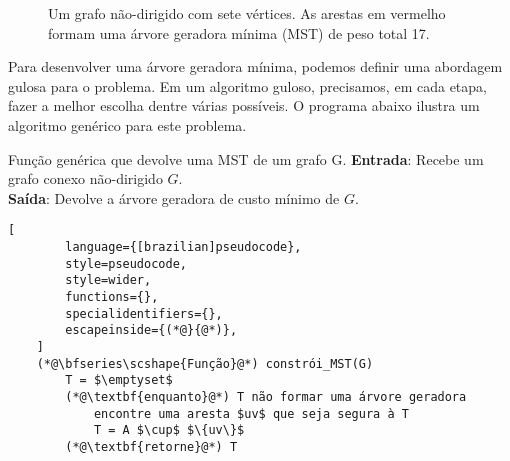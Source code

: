 \begin{figure}
    \centering
    \caption{Um grafo não-dirigido com sete vértices. As arestas em vermelho formam uma árvore geradora mínima (MST) de peso total 17.}
    \label{fig:mst_example}
\end{figure}

Para desenvolver uma árvore geradora mínima, podemos definir uma abordagem gulosa para o problema. Em um algoritmo guloso, precisamos, em cada etapa, fazer a melhor escolha dentre várias possíveis. O programa abaixo ilustra um algoritmo genérico para este problema. 

\begin{programruledcaption}{Função genérica que devolve uma MST de um grafo G.\label{prog:busca}}
    \noindent\textbf{Entrada}: Recebe um grafo conexo não-dirigido $G$.\\
    \textbf{Saída}: Devolve a árvore geradora de custo mínimo de $G$.
    \vspace{-0.5\baselineskip}
    \begin{lstlisting}[
        language={[brazilian]pseudocode},
        style=pseudocode,
        style=wider,
        functions={},
        specialidentifiers={},
        escapeinside={(*@}{@*)},
    ]
    (*@\bfseries\scshape{Função}@*) constrói_MST(G)
        T = $\emptyset$
        (*@\textbf{enquanto}@*) T não formar uma árvore geradora
            encontre uma aresta $uv$ que seja segura à T
            T = A $\cup$ $\{uv\}$
        (*@\textbf{retorne}@*) T
    \end{lstlisting}
    \vspace{-0.5\baselineskip}
\end{programruledcaption}

